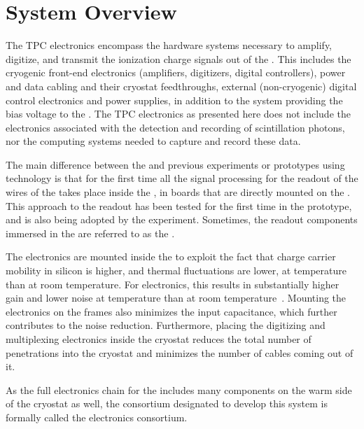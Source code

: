 \section{System Overview}
\label{sec:fdsp-tpcelec-overview}

The TPC electronics encompass the hardware systems necessary to 
amplify, digitize, and transmit the  ionization charge 
signals out of the   . This 
includes the cryogenic front-end electronics (amplifiers, digitizers, 
digital controllers), power and data cabling and their cryostat 
feedthroughs, external (non-cryogenic) digital control electronics and 
power supplies, in addition to the system providing the bias voltage
to the .  The TPC electronics as presented here does not 
include the electronics associated with the detection 
and recording of  scintillation photons, nor the  
computing systems needed to capture and record these data.

The main difference between the    
and previous experiments or prototypes using  technology is
that for the first time all the signal processing for the readout of the
wires of the  takes place inside the , in boards that 
are directly mounted on the . This approach to the 
readout has been tested for the first time in the  prototype,
and is also being adopted by the  experiment. Sometimes, the 
 readout components immersed in the  are referred 
to as the . 

The electronics are mounted inside the  to exploit the fact that 
charge carrier mobility in silicon is higher, and thermal fluctuations are lower,  
at  temperature than at room temperature. For  
electronics, this results in substantially higher gain and lower noise 
at  temperature than at room temperature~\cite{DeGeronimo:2011zz}.
Mounting the  electronics on the  frames also minimizes 
the input capacitance, which further contributes to the noise reduction.  
Furthermore, placing the digitizing and multiplexing electronics inside 
the cryostat reduces the total number of penetrations into the cryostat 
and minimizes the number of cables coming out of it.

As the full  electronics chain for the  includes 
many components on the warm side of the cryostat as well, the  
consortium designated to develop this system is formally called 
the    electronics consortium.

